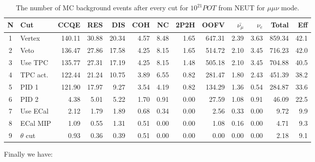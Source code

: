 \documentclass[../main.tex]{subfiles}
\begin{document}
\begin{table}[!ht]
\begin{tabular}{|c|l|r|r|r|r|r|r|r|r|r|r|r|}
  \hline
  N & Cut           &  CCQE   &  RES  &  DIS  &  COH  &  NC  &  2P2H  &  OOFV  &$\bar{\nu_{\mu}}$& $\nu_{e}$ & Total  & Eff\\
  \hline
  1 & Vertex        & 140.11  & 30.88 & 20.34 & 4.57  & 8.48 & 1.65   & 647.31 & 2.39            &  3.63     & 859.34 & 42.1 \\
  \hline
  2 & Veto          & 136.47  & 27.86 & 17.58 & 4.25  & 8.15 & 1.65   & 514.72 & 2.10            &  3.45     & 716.23 & 42.0 \\
  \hline
  3 & Use TPC       & 135.77  & 27.31 & 17.19 & 4.25  & 8.15 & 1.48   & 505.18 & 2.10            &  3.45     & 704.88 & 40.5 \\
  \hline
  4 & TPC act.      & 122.44  & 21.24 & 10.75 & 3.89  & 6.55 & 0.82   & 281.47 & 1.80            &  2.43     & 451.39 & 38.2 \\
  \hline
  5 & PID 1         & 121.90  & 17.97 & 9.27  & 3.54  & 4.19 & 0.82   & 134.29 & 1.36            &  0.54     & 284.87 & 33.6 \\
  \hline
  6 & PID 2         & 4.38    & 5.01  & 5.22  & 1.70  & 0.91 & 0.00   & 27.59  & 1.08            &  0.91     &  46.09 & 22.5 \\
  \hline
  7 & Use ECal      & 2.12    & 1.79  & 1.89  & 0.68  & 0.34 & 0.00   & 2.56   & 0.33            &  0.00     &  9.72  &  9.9  \\
  \hline
  8 & ECal MIP      & 1.09    & 0.55  & 1.31  & 0.51  & 0.00 & 0.00   & 1.08   & 0.16            &  0.00     &  4.71  &  9.3  \\
  \hline
  9 & $\theta$ cut  & 0.93    & 0.36  & 0.39  & 0.51  & 0.00 & 0.00   & 0.00   & 0.00            &  0.00     & 2.18   &  9.1 \\
  \hline

\end{tabular}
\caption{The number of MC background events after every cut for $10^{21} POT$ from NEUT for $\mu\mu\nu$ mode.}
\label{tbl:HNL:bgOrigDiMuon}
\end{table}

Finally we have:
\end{document}
